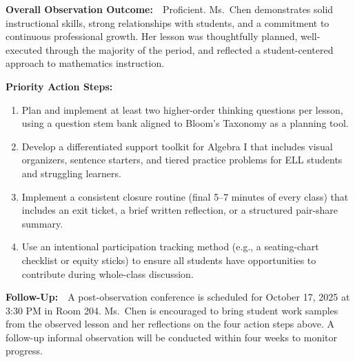 \documentclass[11pt,a4paper]{article}
\begin{document}
\begin{tcolorbox}[colback=lightbg,colframe=borderlight,boxrule=0.5pt,arc=3pt,left=14pt,right=14pt,top=12pt,bottom=12pt]
\textbf{Overall Observation Outcome:}\ \ Proficient. Ms.\ Chen demonstrates solid instructional skills, strong relationships with students, and a commitment to continuous professional growth. Her lesson was thoughtfully planned, well-executed through the majority of the period, and reflected a student-centered approach to mathematics instruction.

\vspace{6pt}
\textbf{Priority Action Steps:}
\begin{enumerate}[leftmargin=*,itemsep=4pt,topsep=4pt]
  \item Plan and implement at least two higher-order thinking questions per lesson, using a question stem bank aligned to Bloom's Taxonomy as a planning tool.
  \item Develop a differentiated support toolkit for Algebra I that includes visual organizers, sentence starters, and tiered practice problems for ELL students and struggling learners.
  \item Implement a consistent closure routine (final 5--7 minutes of every class) that includes an exit ticket, a brief written reflection, or a structured pair-share summary.
  \item Use an intentional participation tracking method (e.g., a seating-chart checklist or equity sticks) to ensure all students have opportunities to contribute during whole-class discussion.
\end{enumerate}

\vspace{4pt}
\textbf{Follow-Up:}\ \ A post-observation conference is scheduled for October 17, 2025 at 3:30 PM in Room 204. Ms.\ Chen is encouraged to bring student work samples from the observed lesson and her reflections on the four action steps above. A follow-up informal observation will be conducted within four weeks to monitor progress.
\end{tcolorbox}

\vspace{16pt}
\end{document}
